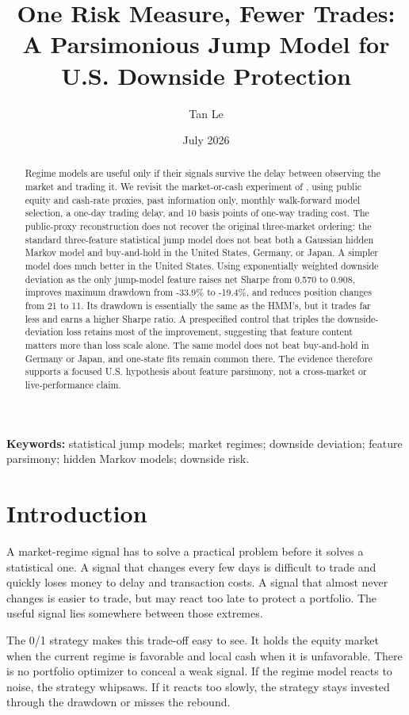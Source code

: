 \documentclass[11pt]{article}
\title{\textbf{One Risk Measure, Fewer Trades:}\\
A Parsimonious Jump Model for U.S. Downside Protection}
\author{Tan Le}
\date{July 2026}
\begin{document}
\maketitle

\begin{abstract}
Regime models are useful only if their signals survive the delay between observing the market and trading it. We revisit the market-or-cash experiment of \citet{shu2024}, using public equity and cash-rate proxies, past information only, monthly walk-forward model selection, a one-day trading delay, and 10 basis points of one-way trading cost. The public-proxy reconstruction does not recover the original three-market ordering: the standard three-feature statistical jump model does not beat both a Gaussian hidden Markov model and buy-and-hold in the United States, Germany, or Japan. A simpler model does much better in the United States. Using exponentially weighted downside deviation as the only jump-model feature raises net Sharpe from 0.570 to 0.908, improves maximum drawdown from -33.9\% to -19.4\%, and reduces position changes from 21 to 11. Its drawdown is essentially the same as the HMM's, but it trades far less and earns a higher Sharpe ratio. A prespecified control that triples the downside-deviation loss retains most of the improvement, suggesting that feature content matters more than loss scale alone. The same model does not beat buy-and-hold in Germany or Japan, and one-state fits remain common there. The evidence therefore supports a focused U.S. hypothesis about feature parsimony, not a cross-market or live-performance claim.
\end{abstract}

\noindent\textbf{Keywords:} statistical jump models; market regimes; downside deviation; feature parsimony; hidden Markov models; downside risk.

\section{Introduction}

A market-regime signal has to solve a practical problem before it solves a statistical one. A signal that changes every few days is difficult to trade and quickly loses money to delay and transaction costs. A signal that almost never changes is easier to trade, but may react too late to protect a portfolio. The useful signal lies somewhere between those extremes.

The 0/1 strategy makes this trade-off easy to see. It holds the equity market when the current regime is favorable and local cash when it is unfavorable. There is no portfolio optimizer to conceal a weak signal. If the regime model reacts to noise, the strategy whipsaws. If it reacts too slowly, the strategy stays invested through the drawdown or misses the rebound.
\end{document}

